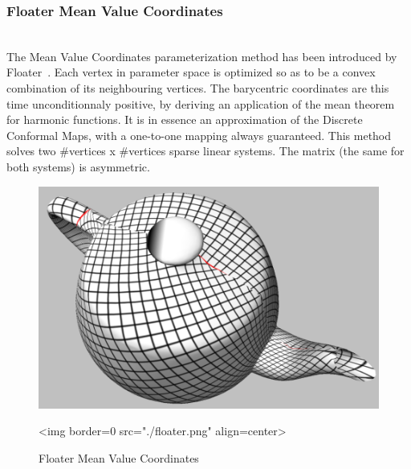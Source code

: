 \subsubsection{Floater Mean Value Coordinates}

  \\

The Mean Value Coordinates parameterization method has been introduced
by Floater~\cite{cgal:f-mvc-03}. Each vertex in parameter space is
optimized so as to be a convex combination of its neighbouring
vertices. The barycentric coordinates are this time unconditionnaly
positive, by deriving an application of the mean theorem for harmonic
functions. It is in essence an approximation of the Discrete Conformal
Maps, with a one-to-one mapping always guaranteed. This method solves
two \#vertices x \#vertices sparse linear systems. The matrix (the
same for both systems) is asymmetric.

\begin{figure}[bht]
    \begin{center}
        \begin{ccTexOnly}
            \includegraphics{Parameterization/floater} %
        \end{ccTexOnly}
        \begin{ccHtmlOnly}
            <img border=0 src="./floater.png" align=center>
        \end{ccHtmlOnly}
        \label{parameterization-fig-floater}

        \caption{Floater Mean Value Coordinates}
    \end{center}
\end{figure}


